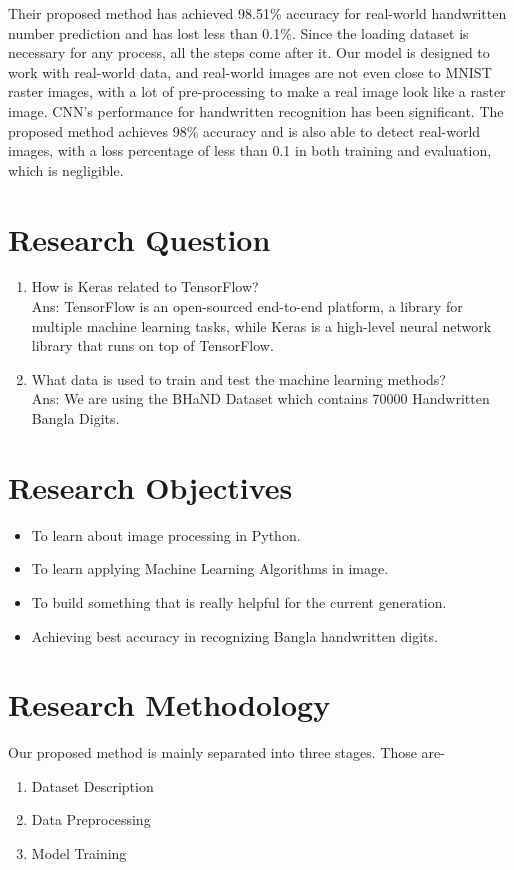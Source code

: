 \documentclass[conference]{IEEEtran}
\begin{document}
Their proposed method has achieved 98.51\% accuracy for real-world handwritten number prediction and has lost less than 0.1\%. Since the loading dataset is necessary for any process, all the steps come after it. Our model is designed to work with real-world data, and real-world images are not even close to MNIST raster images, with a lot of pre-processing to make a real image look like a raster image. CNN's performance for handwritten recognition has been significant. The proposed method achieves 98\% accuracy and is also able to detect real-world images, with a loss percentage of less than 0.1 in both training and evaluation, which is negligible. \cite{Bharadwaj2020-wf} 



\section{Research Question}
\begin{enumerate}
  \item How is Keras related to TensorFlow? \\ {\small Ans: TensorFlow is an open-sourced end-to-end platform, a library for multiple machine learning tasks, while Keras is a high-level neural network library that runs on top of TensorFlow.}

  \item What data is used to train and test the machine learning methods?\\ {\small Ans: We are using the BHaND Dataset which contains 70000 Handwritten Bangla Digits.}
\end{enumerate}


\section{Research Objectives}
\begin{itemize}
  \item To learn about image processing in Python.
  \item To learn applying Machine Learning Algorithms in image.
  \item To build something that is really helpful for the current generation.
  \item Achieving best accuracy in recognizing Bangla handwritten digits. 
\end{itemize}


\section{Research Methodology} 
Our proposed method is mainly separated into three stages. Those are-
\begin{enumerate}[ A.]
  \item Dataset Description 
  \item Data Preprocessing
  \item Model Training
\end{enumerate}
\end{document}
